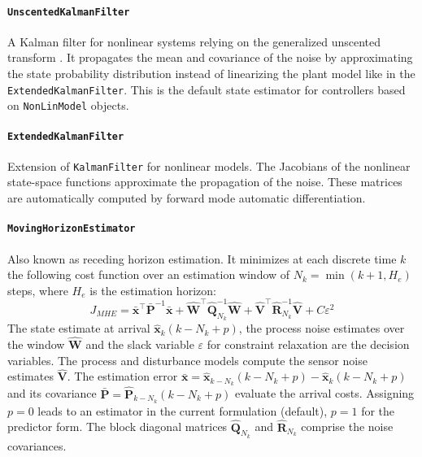 \paragraph{\textnormal{\texttt{UnscentedKalmanFilter}}}
A Kalman filter for nonlinear systems relying on the generalized unscented transform \citep{simon}. It propagates the mean and covariance of the noise by approximating the state probability distribution instead of linearizing the plant model like in the \texttt{ExtendedKalmanFilter}. This is the default state estimator for controllers based on \texttt{NonLinModel} objects.

\paragraph{\textnormal{\texttt{ExtendedKalmanFilter}}}
Extension of \texttt{KalmanFilter} for nonlinear models. The Jacobians of the nonlinear state-space functions approximate the propagation of the noise. These matrices are automatically computed by forward mode automatic differentiation.

\paragraph{\textnormal{\texttt{MovingHorizonEstimator}}}
Also known as receding horizon estimation. It minimizes at each discrete time $k$ the following cost function over an estimation window of $N_k = \min(k+1, H_e)$ steps, where $H_e$ is the estimation horizon:
\begin{equation}\label{eq:J_MHE}
    J_{\mathit{MHE}} = \bar{\mathbf{x}}^\intercal \bar{\mathbf{P}}^{-1} \bar{\mathbf{x}} 
    + \mathbf{\hat{W}}^\intercal \mathbf{\hat{Q}}_{N_k}^{-1} \mathbf{\hat{W}}  
    + \mathbf{\hat{V}}^\intercal \mathbf{\hat{R}}_{N_k}^{-1} \mathbf{\hat{V}}
    + C \varepsilon^2
\end{equation}
The state estimate at arrival $\mathbf{\hat{x}}_k(k-N_k+p)$, the process noise estimates over the window $\mathbf{\hat{W}}$ and the slack variable $\varepsilon$ for constraint relaxation are the decision variables. The process and disturbance models compute the sensor noise estimates $\mathbf{\hat{V}}$. The estimation error $\bar{\mathbf{x}} = \mathbf{\hat{x}}_{k-N_k}(k-N_k+p) - \mathbf{\hat{x}}_{k}(k-N_k+p)$ and its covariance $\bar{\mathbf{P}} = \mathbf{\hat{P}}_{k-N_k}(k-N_k+p)$ evaluate the arrival costs. Assigning $p=0$ leads to an estimator in the current formulation (default), $p=1$ for the predictor form. The block diagonal matrices $\mathbf{\hat{Q}}_{N_k}$ and $\mathbf{\hat{R}}_{N_k}$ comprise the noise covariances.

